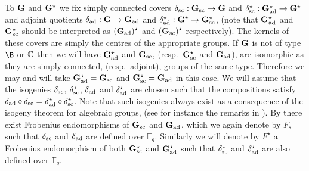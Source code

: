 \documentclass[eqthmnum]{jt-calcs}
\begin{document}
\begin{pa}
To $\mathbf{G}$ and $\mathbf{G}^{\star}$ we fix simply connected covers $\delta_{\operatorname{sc}} : \mathbf{G}_{\operatorname{sc}} \to \mathbf{G}$ and $\delta_{\operatorname{sc}}^{\star} : \mathbf{G}_{\operatorname{ad}}^{\star} \to \mathbf{G}^{\star}$ and adjoint quotients $\delta_{\operatorname{ad}} : \mathbf{G} \to \mathbf{G}_{\operatorname{ad}}$ and $\delta_{\operatorname{ad}}^{\star} : \mathbf{G}^{\star} \to \mathbf{G}_{\operatorname{sc}}^{\star}$, (note that $\mathbf{G}_{\operatorname{ad}}^{\star}$ and $\mathbf{G}_{\operatorname{sc}}^{\star}$ should be interpreted as $(\mathbf{G}_{\operatorname{ad}})^{\star}$ and $(\mathbf{G}_{\operatorname{sc}})^{\star}$ respectively). The kernels of these covers are simply the centres of the appropriate groups. If $\mathbf{G}$ is not of type $\B$ or ${\mathbb C}$ then we will have $\mathbf{G}_{\operatorname{ad}}^{\star}$ and $\mathbf{G}_{\operatorname{sc}}$, (resp.\ $\mathbf{G}_{\operatorname{sc}}^{\star}$ and $\mathbf{G}_{\operatorname{ad}}$), are isomorphic as they are simply connected, (resp.\ adjoint), groups of the same type. Therefore we may and will take $\mathbf{G}_{\operatorname{ad}}^{\star} = \mathbf{G}_{\operatorname{sc}}$ and $\mathbf{G}_{\operatorname{sc}}^{\star} = \mathbf{G}_{\operatorname{ad}}$ in this case. We will assume that the isogenies $\delta_{\operatorname{sc}}$, $\delta_{\operatorname{sc}}^{\star}$, $\delta_{\operatorname{ad}}$ and $\delta_{\operatorname{ad}}^{\star}$ are chosen such that the compositions satisfy $\delta_{\operatorname{ad}} \circ \delta_{\operatorname{sc}}=\delta_{\operatorname{ad}}^{\star} \circ \delta_{\operatorname{sc}}^{\star}$. Note that such isogenies always exist as a consequence of the isogeny theorem for algebraic groups, (see for instance the remarks in \cite[\S1.2]{taylor:2012:thesis}). By \cite[Proposition 22.7]{malle-testerman:2011:linear-algebraic-groups} there exist Frobenius endomorphisms of $\mathbf{G}_{\operatorname{sc}}$ and $\mathbf{G}_{\operatorname{ad}}$, which we again denote by $F$, such that $\delta_{\operatorname{sc}}$ and $\delta_{\operatorname{ad}}$ are defined over $\mathbb{F}_q$. Similarly we will denote by $F^{\star}$ a Frobenius endomorphism of both $\mathbf{G}_{\operatorname{sc}}^{\star}$ and $\mathbf{G}_{\operatorname{ad}}^{\star}$ such that $\delta_{\operatorname{sc}}^{\star}$ and $\delta_{\operatorname{ad}}^{\star}$ are also defined over $\mathbb{F}_q$.
\end{pa}
\end{document}
